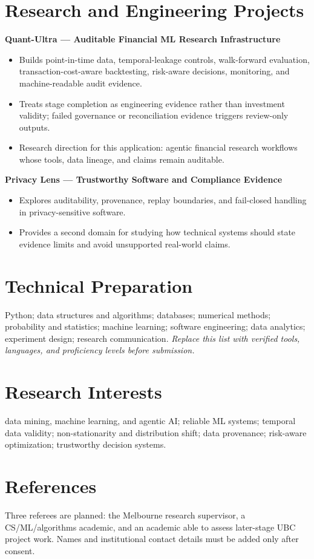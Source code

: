 \documentclass[11pt]{article}
\begin{document}
\section*{Research and Engineering Projects}
\textbf{Quant-Ultra --- Auditable Financial ML Research Infrastructure}
\begin{itemize}
\item Builds point-in-time data, temporal-leakage controls, walk-forward evaluation, transaction-cost-aware backtesting, risk-aware decisions, monitoring, and machine-readable audit evidence.
\item Treats stage completion as engineering evidence rather than investment validity; failed governance or reconciliation evidence triggers review-only outputs.
\item Research direction for this application: agentic financial research workflows whose tools, data lineage, and claims remain auditable.
\end{itemize}

\begin{samepage}
\textbf{Privacy Lens --- Trustworthy Software and Compliance Evidence}
\begin{itemize}
\item Explores auditability, provenance, replay boundaries, and fail-closed handling in privacy-sensitive software.
\item Provides a second domain for studying how technical systems should state evidence limits and avoid unsupported real-world claims.
\end{itemize}
\end{samepage}

\section*{Technical Preparation}
Python; data structures and algorithms; databases; numerical methods; probability and statistics; machine learning; software engineering; data analytics; experiment design; research communication. \textit{Replace this list with verified tools, languages, and proficiency levels before submission.}

\section*{Research Interests}
data mining, machine learning, and agentic AI; reliable ML systems; temporal data validity; non-stationarity and distribution shift; data provenance; risk-aware optimization; trustworthy decision systems.

\section*{References}
Three referees are planned: the Melbourne research supervisor, a CS/ML/algorithms academic, and an academic able to assess later-stage UBC project work. Names and institutional contact details must be added only after consent.
\end{document}
